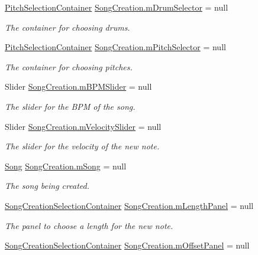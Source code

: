 \begin{DoxyCompactItemize}
\hyperlink{class_song_creation_1_1_pitch_selection_container}{Pitch\+Selection\+Container} \hyperlink{group___s_c_priv_var_ga3f1c71d8cabe505745220d728c6f97bc}{Song\+Creation.\+m\+Drum\+Selector} = null
\begin{DoxyCompactList}\small\item\em The container for choosing drums. \end{DoxyCompactList}\item 
\hyperlink{class_song_creation_1_1_pitch_selection_container}{Pitch\+Selection\+Container} \hyperlink{group___s_c_priv_var_gac32e68713b2b504807f52acef445df1c}{Song\+Creation.\+m\+Pitch\+Selector} = null
\begin{DoxyCompactList}\small\item\em The container for choosing pitches. \end{DoxyCompactList}\item 
Slider \hyperlink{group___s_c_priv_var_ga6f751fe7fc31196eeec490cdbc679baa}{Song\+Creation.\+m\+B\+P\+M\+Slider} = null
\begin{DoxyCompactList}\small\item\em The slider for the B\+PM of the song. \end{DoxyCompactList}\item 
Slider \hyperlink{group___s_c_priv_var_ga0738678367556ebb69df6e73213f616d}{Song\+Creation.\+m\+Velocity\+Slider} = null
\begin{DoxyCompactList}\small\item\em The slider for the velocity of the new note. \end{DoxyCompactList}\item 
\hyperlink{class_song}{Song} \hyperlink{group___s_c_priv_var_ga9554e9b3758d1cc1e841a5f7d8aa9f56}{Song\+Creation.\+m\+Song} = null
\begin{DoxyCompactList}\small\item\em The song being created. \end{DoxyCompactList}\item 
\hyperlink{class_song_creation_1_1_song_creation_selection_container}{Song\+Creation\+Selection\+Container} \hyperlink{group___s_c_priv_var_ga370237b50bc11a581fc963cdd8ffd4ea}{Song\+Creation.\+m\+Length\+Panel} = null
\begin{DoxyCompactList}\small\item\em The panel to choose a length for the new note. \end{DoxyCompactList}\item 
\hyperlink{class_song_creation_1_1_song_creation_selection_container}{Song\+Creation\+Selection\+Container} \hyperlink{group___s_c_priv_var_gafeeda8ab122f574c6fff94814234334c}{Song\+Creation.\+m\+Offset\+Panel} = null

\end{DoxyCompactItemize}

